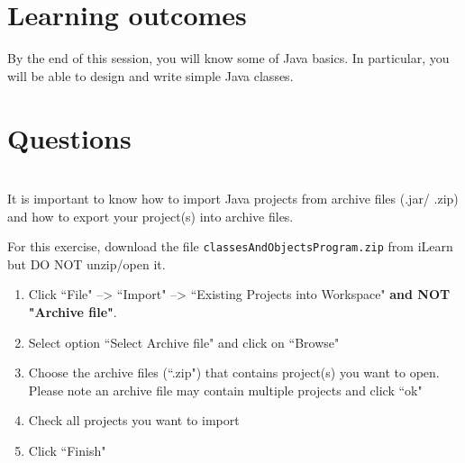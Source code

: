 \section*{Learning outcomes}

By the end of this session, you will know some of Java basics.
In particular, you will be able to design and write simple Java classes.

\section*{Questions}

\begin{questions}

%
%
%

\\
 
It is important to know how to import Java projects from archive files (.jar/ .zip) and how to export your project(s) into archive files. 

For this exercise, download the file \texttt{classesAndObjectsProgram.zip} from iLearn but \color{red}DO NOT unzip/open it\color{black}.

\begin{enumerate}
\item Click ``File" --> ``Import" --> ``Existing Projects into Workspace" \color{red}\textbf{and NOT "Archive file"}\color{black}.
\item Select option ``Select Archive file" and click on ``Browse"
\item Choose the archive files (``.zip") that contains project(s) you want to open. Please note an archive file may contain multiple projects and click ``ok"
\item Check all projects you want to import
\item Click ``Finish"
\end{enumerate}


\end{questions}
